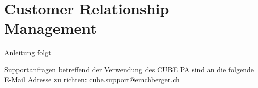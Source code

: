 
\clearpage
\section{Customer Relationship Management}

Anleitung folgt


Supportanfragen betreffend der Verwendung des CUBE PA sind an die folgende E-Mail Adresse zu richten: {\color{red} cube.support@emchberger.ch}

